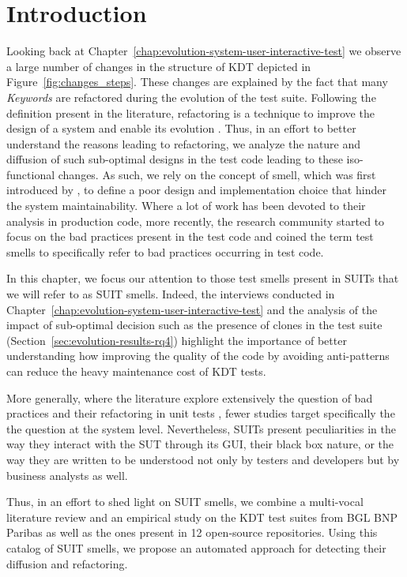 \section{Introduction}


Looking back at Chapter~\ref{chap:evolution-system-user-interactive-test} we observe a large number of changes in the structure of KDT depicted in Figure~\ref{fig:changes_steps}. These changes are explained by the fact that many \emph{Keywords} are refactored during the evolution of the test suite. Following the definition present in the literature, refactoring is a technique to improve the design of a system and enable its evolution \cite{Fowler1999}. Thus, in an effort to better understand the reasons leading to refactoring, we analyze the nature and diffusion of such sub-optimal designs in the test code leading to these iso-functional changes. As such, we rely on the concept of smell, which was first introduced by \textcite{Fowler1999}, to define a  poor design and implementation choice that hinder the system maintainability. Where a lot of work has been devoted to their analysis in production code, more recently, the research community started to focus on the bad practices present in the test code \cite{VanDeursen2001, Meszaros2007, Reichhart2007, VanRompaey2007, Chen2012, Hauptmann2013, Bavota2015, Tufano2016, Bowes2017, Kim2020, Peruma2020} and coined the term test smells to specifically refer to bad practices occurring in test code.

In this chapter, we focus our attention to those test smells present in SUITs that we will refer to as SUIT smells. Indeed, the interviews conducted in Chapter~\ref{chap:evolution-system-user-interactive-test} and the analysis of the impact of sub-optimal decision such as the presence of clones in the test suite (Section~\ref{sec:evolution-results-rq4}) highlight the importance of better understanding how improving the quality of the code by avoiding  anti-patterns can reduce the heavy maintenance cost of KDT tests.

More generally, where the literature explore extensively the question of bad practices and their refactoring in unit tests \cite{VanDeursen2001, Meszaros2007, Reichhart2007, VanRompaey2007, Bavota2015, Tufano2016, Bowes2017, Kim2020, Peruma2020}, fewer studies \cite{Chen2012, Hauptmann2013} target specifically the the question at the system level. Nevertheless, SUITs present peculiarities in the way they interact with the SUT through its GUI, their black box nature, or the way they are written to be understood not only by testers and developers but by business analysts as well. 

Thus, in an effort to shed light on SUIT smells, we combine a multi-vocal literature review and an empirical study on the KDT test suites from BGL BNP Paribas as well as the ones present in 12 open-source repositories. Using this catalog of SUIT smells, we propose an automated approach for detecting their diffusion and refactoring.

